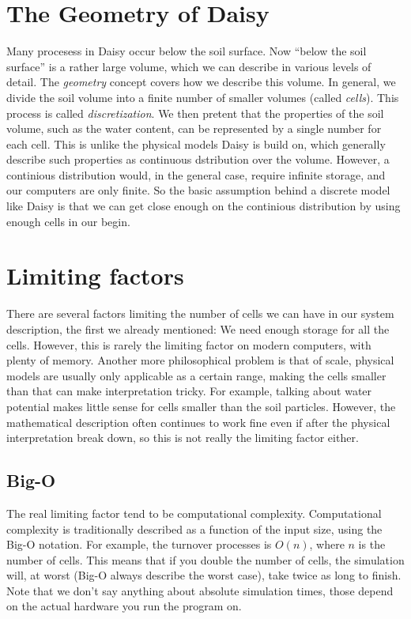 \documentclass[a4paper,11pt,twoside]{article}
\begin{document}
\section*{The Geometry  of Daisy}

Many procesess in Daisy occur below the soil surface.  Now ``below
the soil surface'' is a rather large volume, which we can describe in
various levels of detail.  The \emph{geometry} concept covers how we
describe this volume.  In general, we divide the soil volume into a
finite number of smaller volumes (called \emph{cells}).  This process
is called \emph{discretization}.  We then pretent that the properties
of the soil volume, such as the water content, can be represented by a
single number for each cell.  This is unlike the physical models Daisy
is build on, which generally describe such properties as continuous
dstribution over the volume.  However, a continious distribution
would, in the general case, require infinite storage, and our
computers are only finite.  So the basic assumption behind a discrete
model like Daisy is that we can get close enough on the continious
distribution by using enough cells in our begin.

\section{Limiting factors}

There are several factors limiting the number of cells we can have in
our system description, the first we already mentioned: We need enough
storage for all the cells.  However, this is rarely the limiting
factor on modern computers, with plenty of memory.  Another more
philosophical problem is that of scale, physical models are usually
only applicable as a certain range, making the cells smaller than that
can make interpretation tricky.  For example, talking about water
potential makes little sense for cells smaller than the soil
particles.  However, the mathematical description often continues to
work fine even if after the physical interpretation break down, so
this is not really the limiting factor either.

\subsection{Big-O}

The real limiting factor tend to be computational complexity.
Computational complexity is traditionally described as a function of
the input size, using the Big-O notation.  For example, the turnover
processes is $O(n)$, where $n$ is the number of cells.  This means
that if you double the number of cells, the simulation will, at worst
(Big-O always describe the worst case), take twice as long to finish.
Note that we don't say anything about absolute simulation times, those
depend on the actual hardware you run the program on.
\end{document}
